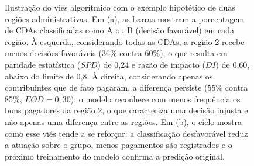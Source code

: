 \begin{figure}[H]
{%
    }
    \caption[Ilustração do viés algorítmico entre dois grupos de contribuintes]{Ilustração do viés algorítmico com o exemplo hipotético de duas regiões administrativas. Em (a), as barras mostram a porcentagem de CDAs classificadas como A ou B (decisão favorável) em cada região. À esquerda, considerando todas as CDAs, a região 2 recebe menos decisões favoráveis (36\% contra 60\%), o que resulta em paridade estatística ($SPD$) de 0,24 e razão de impacto ($DI$) de 0,60, abaixo do limite de 0,8. À direita, considerando apenas os contribuintes que de fato pagaram, a diferença persiste (55\% contra 85\%, $EOD = 0{,}30$): o modelo reconhece com menos frequência os bons pagadores da região 2, o que caracteriza uma decisão injusta e não apenas uma diferença entre as regiões. Em (b), o ciclo mostra como esse viés tende a se reforçar: a classificação desfavorável reduz a atuação sobre o grupo, menos pagamentos são registrados e o próximo treinamento do modelo confirma a predição original.}
    \label{fig:ilustracao_vies}
\end{figure}
